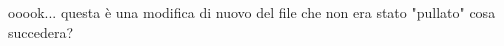\usepackage{pdfcomment}


    ooook... questa è una modifica di nuovo del file che non era stato "pullato" cosa succedera?

